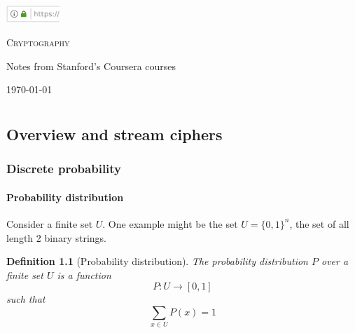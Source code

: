 \documentclass[10pt,a4paper]{report}
\newtheorem{definition}{Definition}[section]
\begin{document}
\begin{titlepage}
    \centering

    \includegraphics[width=0.15\textwidth]{browser_padlock}\par
    
    \vspace{1cm}

    {\scshape\Huge Cryptography\par}

    \vspace{1.25cm}

    {\large Notes from Stanford's Coursera courses\par}

    \vfill

    {\small \today\par}

\end{titlepage}

\tableofcontents
\newpage

\part{}

\chapter{Overview and stream ciphers}

\section{Discrete probability}

\subsection{Probability distribution}

Consider a finite set $U$. One example might be the set $U = \{0, 1\}^n$, the set of all length 2
binary strings.

\begin{definition}[Probability distribution]
    The probability distribution $P$ over a finite set $U$ is a function
        $$ P\colon U \to [0, 1] $$
    such that
        $$ \sum_{x \in U} P(x) = 1 $$
\end{definition}
\end{document}
